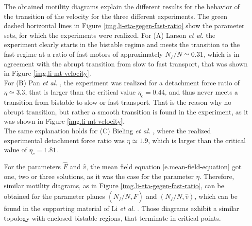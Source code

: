 The obtained motility diagrams explain the different results for the behavior of the transition of the velocity for the three different experiments. The green dashed horizontal lines in Figure
\ref{img.li-eta-gegen-fast-ratio} show the parameter sets, for which the experiments were realized. For (A) Larson \textit{et al.} \cite{larson} the experiment clearly starts in the bistable regime
and meets the transition to the fast regime at a ratio of fast motors of approximately \mbox{$N_f/N \simeq 0.31$}, which is in agreement with the abrupt transition from slow to fast transport, that
was shown in Figure \ref{img.li-mt-velocity}.\\
For (B) Pan \textit{et al.} \cite{jcb174}, the experiment was realized for a detachment force ratio of \mbox{$\eta \simeq 3.3$}, that is larger than the critical value \mbox{$\eta_c = 0.44$}, and
thus never meets a transition from bistable to slow or fast transport. That is the reason why no abrupt transition, but rather a smooth transition is found in the experiment, as it was shown in
Figure \ref{img.li-mt-velocity}.\\
The same explanation holds for (C) Bieling \textit{et al.} \cite{bieling}, where the realized experimental detachment force ratio was \mbox{$\eta \simeq 1.9$}, which is larger than the critical
value of \mbox{$\eta_c = 1.81$}.


For the parameters $\hat F$ and $\hat v$, the mean field equation \eqref{e.mean-field-equation} got one, two or three solutions, as it was the case for the parameter $\eta$. Therefore, similar motility diagrams, as in Figure
\ref{img.li-eta-gegen-fast-ratio}, can be obtained for the parameter planes \mbox{$\left(N_f/N, \hat F\right)$} and \mbox{$\left(N_f/N, \hat v\right)$}, which can be found in the supporting
material of Li \textit{et al.} \cite{li}. Those diagrams exhibit a similar topology with enclosed bistable regions, that terminate in critical points.


